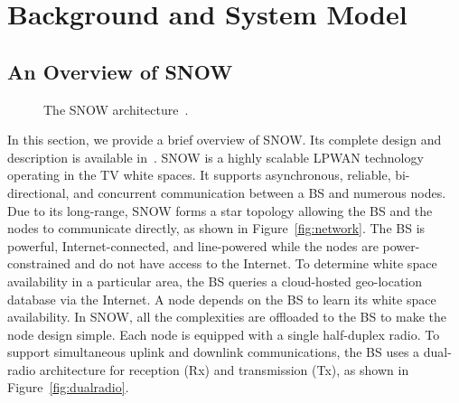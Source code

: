 \section{Background and System Model}\label{sec:model}
\subsection{An Overview of SNOW}\label{sec:snow_overview}
\begin{figure*}[!htbp]
    \centering
      \hfill
    \caption{The SNOW architecture~\cite{snow2}.}
    \label{fig:arch}
\end{figure*}
In this section, we provide a brief overview of SNOW. Its complete design and description is available in~\cite{mydissertation}. SNOW is a highly scalable LPWAN technology operating in the TV white spaces. It supports asynchronous, reliable, bi-directional, and concurrent communication between a BS and numerous nodes. Due to its long-range, SNOW forms a star topology allowing the BS and the nodes to communicate directly, as shown in Figure~\ref{fig:network}. The BS is powerful, Internet-connected, and line-powered while the nodes are power-constrained and do not have access to the Internet. To determine white space availability in a particular area, the BS queries a cloud-hosted geo-location database via the Internet. A node depends on the BS to learn its white space availability. In SNOW, all the complexities are offloaded to the BS to make the node design simple. 
Each node is equipped with a single half-duplex radio. To support simultaneous uplink and downlink communications, the BS uses a dual-radio architecture for reception (Rx) and transmission (Tx), as shown in Figure~\ref{fig:dualradio}.

